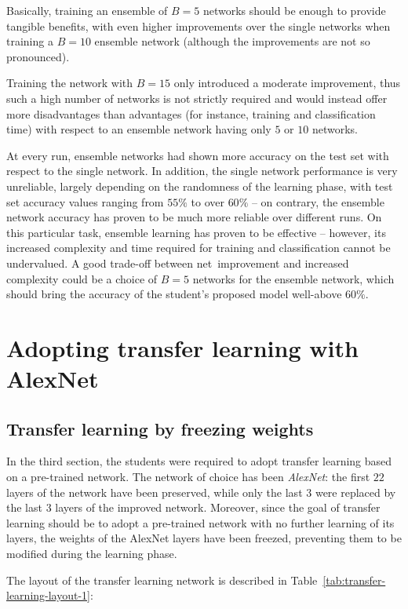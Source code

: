 \documentclass[a4paper, 11pt]{article} %
\begin{document}
Basically, training an ensemble of $B=5$ networks should be enough to provide tangible benefits, with even higher improvements over the single networks when training a $B=10$ ensemble network (although the improvements are not so pronounced).

Training the network with $B=15$ only introduced a moderate improvement, thus such a high number of networks is not strictly required and would instead offer more disadvantages than advantages (for instance, training and classification time) with respect to an ensemble network having only $5$ or $10$ networks.

At every run, ensemble networks had shown more accuracy on the test set with respect to the single network. In addition, the single network performance is very unreliable, largely depending on the randomness of the learning phase, with test set accuracy values ranging from $55\%$ to over $60\%$ \--- on contrary, the ensemble network accuracy has proven to be much more reliable over different runs. On this particular task, ensemble learning has proven to be effective \--- however, its increased complexity and time required for training and classification cannot be undervalued. A good trade-off between net~improvement and increased complexity could be a choice of $B=5$ networks for the ensemble network, which should bring the accuracy of the student's proposed model well-above $60\%$.
 
\section{Adopting transfer learning with AlexNet}
\subsection{Transfer learning by freezing weights}\label{sec:transfer-learning-1}

In the third section, the students were required to adopt transfer learning based on a pre-trained network. The network of choice has been \emph{AlexNet}: the first $22$ layers of the network have been preserved, while only the last $3$ were replaced by the last $3$ layers of the improved network. Moreover, since the goal of transfer learning should be to adopt a pre-trained network with no further learning of its layers, the weights of the AlexNet layers have been freezed, preventing them to be modified during the learning phase. 

The layout of the transfer learning network is described in Table~\ref{tab:transfer-learning-layout-1}:
\end{document}
